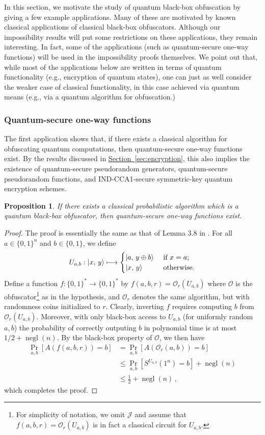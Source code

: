\documentclass[11pt]{article}
\numberwithin{equation}{section}
\newtheorem{prop}{Proposition}
\newcommand{\opn}{\operatorname}
\newcommand{\expref}[2]{\texorpdfstring{\hyperref[#2]{#1~\ref{#2}}}{#1~\ref{#2}}}
\newcommand{\algo}{\mathcal}
\newcommand{\negl}{\opn{negl}}
\newcommand{\prob}{\opn{Pr}}
\begin{document}
{In this section, we motivate the study of quantum black-box obfuscation by giving a few example applications. Many of these are motivated by known classical applications of classical black-box obfuscators. Although our impossibility results will put some restrictions on these applications, they remain interesting. In fact, some of the applications (such as quantum-secure one-way functions) will be used in the impossibility proofs themselves. We point out that, while most of the applications below are written in terms of quantum functionality (e.g., encryption of quantum states), one can just as well consider the weaker case of classical functionality, in this case achieved via quantum means (e.g., via a quantum algorithm for obfuscation.)

\subsubsection{Quantum-secure one-way functions}

The first application shows that, if there exists a classical algorithm for obfuscating quantum computations, then quantum-secure one-way functions exist. By the results discussed in \expref{Section}{sec:encryption}, this also implies the existence of quantum-secure pseudorandom generators, quantum-secure pseudorandom functions, and IND-CCA1-secure symmetric-key quantum encryption schemes.

\begin{prop}
If there exists a classical probabilistic algorithm which is a quantum black-box obfuscator, then quantum-secure one-way functions exist.
\end{prop}
\begin{proof}
The proof is essentially the same as that of Lemma 3.8 in \cite{BGIRSVY12}. For all $a \in \{0, 1\}^n$ and $b \in \{0, 1\}$, we define 
$$
U_{a, b} : {\left\vert{x,\, y}\right\rangle} \longmapsto
\begin{cases}
{\left\vert{a,\, y \oplus b}\right\rangle} &\text{ if } x = a;\\
{\left\vert{x,\, y}\right\rangle} &\text{ otherwise}.
\end{cases}
$$
Define a function $f : \{0, 1\}^* \rightarrow \{0, 1\}^*$ by $f(a, b, r) = \algo O_r(U_{a, b})$ where $\algo O$ is the obfuscator\footnote{For simplicity of notation, we omit $\algo J$ and assume that $f(a, b, r) = \algo O_r(U_{a, b})$ is in fact a classical circuit for $U_{a, b}$.} as in the hypothesis, and $\algo O_r$ denotes the same algorithm, but with randomness coins initialized to $r$. Clearly, inverting $f$ requires computing $b$ from $\algo O_r(U_{a, b})$. Moreover, with only black-box access to $U_{a, b}$ (for uniformly random $a, b$) the probability of correctly outputing $b$ in polynomial time is at most $1/2 + \negl(n)$.  By the black-box property of $\mathcal O$, we then have
\begin{align*}
\prob_{a, b} [ A(f(a, b, r)) = b] 
&= \prob_{a, b} [ A(\mathcal O_r(a, b)) = b ]\\
&\leq \prob_{a, b} \left[ S^{U_{a, b}}(1^n) = b\right] + \negl(n)\\
&\leq \frac{1}{2} + \negl(n)\,,
\end{align*}
which completes the proof.
\end{proof}

}
\end{document}

